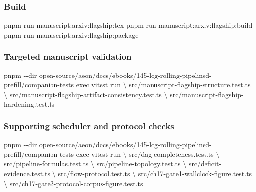 \documentclass[
  11pt,
]{article}
\newenvironment{Shaded}{}{}
\newcommand{\AttributeTok}[1]{\textcolor[rgb]{0.49,0.56,0.16}{#1}}
\newcommand{\DataTypeTok}[1]{\textcolor[rgb]{0.56,0.13,0.00}{#1}}
\newcommand{\ExtensionTok}[1]{#1}
\newcommand{\NormalTok}[1]{#1}
\begin{document}
\subsubsection{Build}\label{build}

\begin{Shaded}
\begin{Highlighting}[]
\ExtensionTok{pnpm}\NormalTok{ run manuscript:arxiv:flagship:tex}
\ExtensionTok{pnpm}\NormalTok{ run manuscript:arxiv:flagship:build}
\ExtensionTok{pnpm}\NormalTok{ run manuscript:arxiv:flagship:package}
\end{Highlighting}
\end{Shaded}

\subsubsection{Targeted manuscript
validation}\label{targeted-manuscript-validation}

\begin{Shaded}
\begin{Highlighting}[]
\ExtensionTok{pnpm} \AttributeTok{{-}{-}dir}\NormalTok{ open{-}source/aeon/docs/ebooks/145{-}log{-}rolling{-}pipelined{-}prefill/companion{-}tests exec vitest run }\DataTypeTok{\textbackslash{}}
\NormalTok{  src/manuscript{-}flagship{-}structure.test.ts }\DataTypeTok{\textbackslash{}}
\NormalTok{  src/manuscript{-}flagship{-}artifact{-}consistency.test.ts }\DataTypeTok{\textbackslash{}}
\NormalTok{  src/manuscript{-}flagship{-}hardening.test.ts}
\end{Highlighting}
\end{Shaded}

\subsubsection{Supporting scheduler and protocol
checks}\label{supporting-scheduler-and-protocol-checks}

\begin{Shaded}
\begin{Highlighting}[]
\ExtensionTok{pnpm} \AttributeTok{{-}{-}dir}\NormalTok{ open{-}source/aeon/docs/ebooks/145{-}log{-}rolling{-}pipelined{-}prefill/companion{-}tests exec vitest run }\DataTypeTok{\textbackslash{}}
\NormalTok{  src/dag{-}completeness.test.ts }\DataTypeTok{\textbackslash{}}
\NormalTok{  src/pipeline{-}formulas.test.ts }\DataTypeTok{\textbackslash{}}
\NormalTok{  src/pipeline{-}topology.test.ts }\DataTypeTok{\textbackslash{}}
\NormalTok{  src/deficit{-}evidence.test.ts }\DataTypeTok{\textbackslash{}}
\NormalTok{  src/flow{-}protocol.test.ts }\DataTypeTok{\textbackslash{}}
\NormalTok{  src/ch17{-}gate1{-}wallclock{-}figure.test.ts }\DataTypeTok{\textbackslash{}}
\NormalTok{  src/ch17{-}gate2{-}protocol{-}corpus{-}figure.test.ts}
\end{Highlighting}
\end{Shaded}
\end{document}
